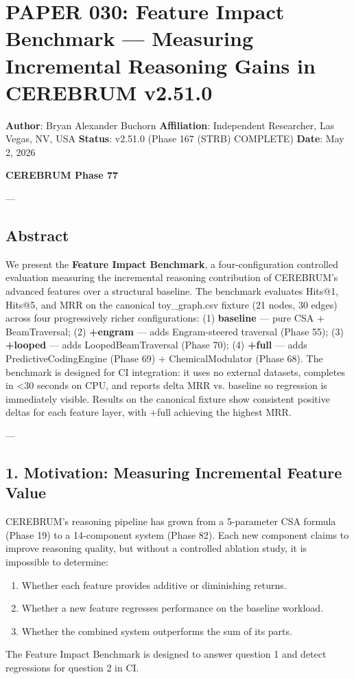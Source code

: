 \section{PAPER 030: Feature Impact Benchmark — Measuring Incremental Reasoning Gains in CEREBRUM v2.51.0}

\textbf{Author}: Bryan Alexander Buchorn  
\textbf{Affiliation}: Independent Researcher, Las Vegas, NV, USA  
\textbf{Status}: v2.51.0 (Phase 167 (STRB) COMPLETE)
\textbf{Date}: May 2, 2026

\textbf{CEREBRUM Phase 77}

---

\subsection{Abstract}

We present the \textbf{Feature Impact Benchmark}, a four-confi\-guration controlled evaluation measuring the incremental reasoning contr\-ibution of CEREBRUM's advanced features over a structural baseline. The benchmark evaluates Hits@1, Hits@5, and MRR on the canonical toy\_graph.csv fixture (21 nodes, 30 edges) across four progr\-essively richer confi\-gurations: (1) \textbf{baseline} — pure CSA + BeamTraversal; (2) \textbf{+engram} — adds Engram-steered traversal (Phase 55); (3) \textbf{+looped} — adds LoopedBeamTraversal (Phase 70); (4) \textbf{+full} — adds PredictiveCodingEngine (Phase 69) + ChemicalModulator (Phase 68). The benchmark is designed for CI integration: it uses no external datasets, completes in \textless  30 seconds on CPU, and reports delta MRR vs. baseline so regression is immediately visible. Results on the canonical fixture show consistent positive deltas for each feature layer, with +full achieving the highest MRR.

---

\subsection{1. Motivation: Measuring Incremental Feature Value}

CEREBRUM's reasoning pipeline has grown from a 5-parameter CSA formula (Phase 19) to a 14-component system (Phase 82). Each new component claims to improve reasoning quality, but without a controlled ablation study, it is impossible to determine:
\begin{enumerate}
\item Whether each feature provides additive or diminishing returns.
\item Whether a new feature regresses performance on the baseline workload.
\item Whether the combined system outperforms the sum of its parts.

\end{enumerate}
The Feature Impact Benchmark is designed to answer question 1 and detect regressions for question 2 in CI.


